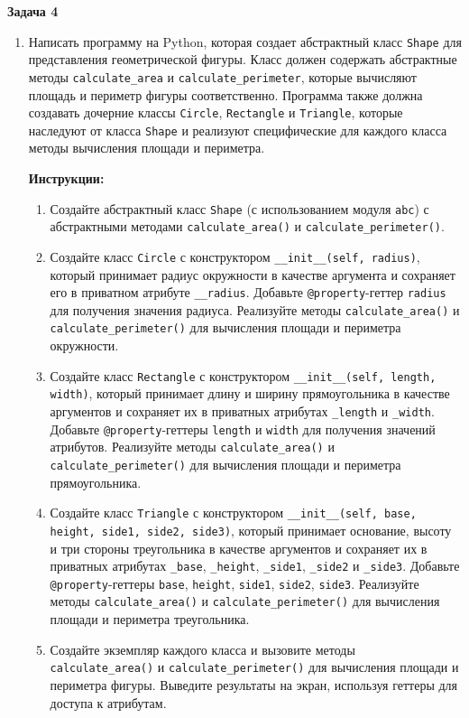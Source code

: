 
\textbf{Задача 4}

\begin{enumerate}
    \item 

    Написать программу на Python, которая создает абстрактный класс \texttt{Shape} для представления геометрической фигуры. 
Класс должен содержать абстрактные методы \texttt{calculate\_area} и \texttt{calculate\_perimeter}, 
которые вычисляют площадь и периметр фигуры соответственно. 
Программа также должна создавать дочерние классы \texttt{Circle}, \texttt{Rectangle} и \texttt{Triangle}, 
которые наследуют от класса \texttt{Shape} и реализуют специфические для каждого класса методы вычисления площади и периметра.

\textbf{Инструкции:}
\begin{enumerate}
    \item Создайте абстрактный класс \texttt{Shape} (с использованием модуля \texttt{abc}) с абстрактными методами 
    \texttt{calculate\_area()} и \texttt{calculate\_perimeter()}.
    \item Создайте класс \texttt{Circle} с конструктором \texttt{\_\_init\_\_(self, radius)}, 
    который принимает радиус окружности в качестве аргумента и сохраняет его в приватном атрибуте \texttt{\_\_radius}.  
    Добавьте \texttt{@property}-геттер \texttt{radius} для получения значения радиуса.  
    Реализуйте методы \texttt{calculate\_area()} и \texttt{calculate\_perimeter()} для вычисления площади и периметра окружности.
    \item Создайте класс \texttt{Rectangle} с конструктором \texttt{\_\_init\_\_(self, length, width)}, 
    который принимает длину и ширину прямоугольника в качестве аргументов и сохраняет их в приватных атрибутах 
    \texttt{\_length} и \texttt{\_width}.  
    Добавьте \texttt{@property}-геттеры \texttt{length} и \texttt{width} для получения значений атрибутов.  
    Реализуйте методы \texttt{calculate\_area()} и \texttt{calculate\_perimeter()} для вычисления площади и периметра прямоугольника.
    \item Создайте класс \texttt{Triangle} с конструктором \texttt{\_\_init\_\_(self, base, height, side1, side2, side3)}, 
    который принимает основание, высоту и три стороны треугольника в качестве аргументов и сохраняет их в приватных атрибутах 
    \texttt{\_base}, \texttt{\_height}, \texttt{\_side1}, \texttt{\_side2} и \texttt{\_side3}.  
    Добавьте \texttt{@property}-геттеры \texttt{base}, \texttt{height}, \texttt{side1}, \texttt{side2}, \texttt{side3}.  
    Реализуйте методы \texttt{calculate\_area()} и \texttt{calculate\_perimeter()} для вычисления площади и периметра треугольника.
    \item Создайте экземпляр каждого класса и вызовите методы \texttt{calculate\_area()} и \texttt{calculate\_perimeter()} 
    для вычисления площади и периметра фигуры. Выведите результаты на экран, используя геттеры для доступа к атрибутам.
\end{enumerate}


\end{enumerate}
